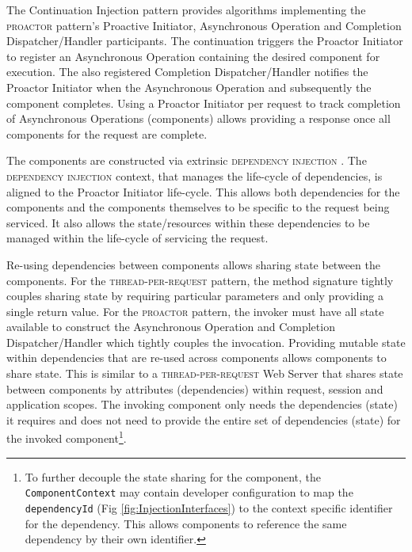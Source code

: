 \documentclass[prodmode]{style/acmlarge}
\begin{document}
The Continuation Injection pattern provides algorithms implementing the
\textsc{proactor} pattern's Proactive Initiator, Asynchronous Operation and
Completion Dispatcher/Handler participants.  The continuation triggers the
Proactor Initiator to register an Asynchronous Operation containing the desired
component for execution.  The also registered Completion Dispatcher/Handler
notifies the Proactor Initiator when the Asynchronous Operation and subsequently
the component completes.  Using a Proactor Initiator per request to track
completion of Asynchronous Operations (components) allows providing a response
once all components for the request are complete.

The components are constructed via extrinsic \textsc{dependency injection}
\cite{ioc}. The \textsc{dependency injection} context, that manages the
life-cycle of dependencies, is aligned to the Proactor Initiator life-cycle.
This allows both dependencies for the components and the components themselves
to be specific to the request being serviced.  It also allows the
state/resources within these dependencies to be managed within the life-cycle of
servicing the request.

Re-using dependencies between components allows sharing state between the
components.  For the \textsc{thread-per-request} pattern, the method signature
tightly couples sharing state by requiring particular parameters and only
providing a single return value.  For the \textsc{proactor} pattern, the invoker
must have all state available to construct the Asynchronous Operation and
Completion Dispatcher/Handler which tightly couples the invocation.  Providing
mutable state within dependencies that are re-used across components allows
components to share state.  This is similar to a \textsc{thread-per-request} Web
Server that shares state between components by attributes (dependencies) within
request, session and application scopes.  The invoking component only needs the
dependencies (state) it requires and does not need to provide the entire set of
dependencies (state) for the invoked component\footnote{To further decouple the
state sharing for the component, the \texttt{ComponentContext} may contain
developer configuration to map the \texttt{dependencyId} (Fig
\ref{fig:InjectionInterfaces}) to the context specific identifier for the
dependency. This allows components to reference the same dependency by their own
identifier.}.
\end{document}
